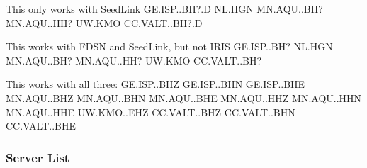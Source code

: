 \documentclass[letterpaper,11pt,english]{sphinxmanual}
\begin{document}
%
\begin{sphinxVerbatim}[commandchars=\\\{\}]
\PYGZsh{} This only works with SeedLink
GE.ISP..BH?.D
NL.HGN
MN.AQU..BH?
MN.AQU..HH?
UW.KMO
CC.VALT..BH?.D

\PYGZsh{} This works with FDSN and SeedLink, but not IRIS
GE.ISP..BH?
NL.HGN
MN.AQU..BH?
MN.AQU..HH?
UW.KMO
CC.VALT..BH?

\PYGZsh{} This works with all three:
GE.ISP..BHZ
GE.ISP..BHN
GE.ISP..BHE
MN.AQU..BHZ
MN.AQU..BHN
MN.AQU..BHE
MN.AQU..HHZ
MN.AQU..HHN
MN.AQU..HHE
UW.KMO..EHZ
CC.VALT..BHZ
CC.VALT..BHN
CC.VALT..BHE
\end{sphinxVerbatim}


\subsubsection{Server List}
\end{document}
